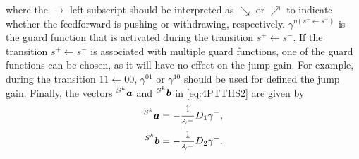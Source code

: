 \documentclass[../DC2017114Bouma.tex]{subfiles}
\begin{document}
\begin{sloppypar}
\begin{mydef}[PTTHS]
where the $\rightarrow$ left subscript should be interpreted as $\searrow$ or $\nearrow$ to indicate whether the feedforward is pushing or withdrawing, respectively. $\gamma^{\eta(s^+\leftarrow s^-)}$ is the guard function that is activated during the transition $s^+\leftarrow s^-$. If the transition $s^+\leftarrow s^-$ is associated with multiple guard functions, one of the guard functions can be chosen, as it will have no effect on the jump gain. For example, during the transition $11\leftarrow 00$, $\gamma^{01}$ or $\gamma^{10}$ should be used for defined the jump gain. Finally, the vectors $\hspace{0cm}^{S^k}{\boldsymbol{a}}$ and $\hspace{0cm}^{S^k}{\boldsymbol{b}}$ in \eqref{eq:4PTTHS2} are given by
\begin{align*}
\hspace{0cm}^{S^k}{\boldsymbol{a}} &= -\frac{1}{\dot{\gamma}^{-}}D_1\gamma^{-},\\
\hspace{0cm}^{S^k}{\boldsymbol{b}} &= -\frac{1}{\dot{\gamma}^{-}}D_2\gamma^{-}.
\end{align*}
\end{mydef}
\end{sloppypar}


%
%
%
%
%
%
\end{document}
